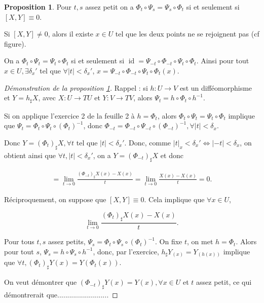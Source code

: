 \documentclass[french]{article}
\theoremstyle{definition}
\newtheorem{protoproposition}{Proposition}[section]
\newenvironment{prop}
    {\colorlet{shadecolor}{blue!5}\begin{shaded}\begin{protoproposition}}
    {\end{protoproposition}\end{shaded}}
\newcommand{\lesss}{<}
\newcommand{\less}{\lesss}
\begin{document}
\begin{prop}\label{crochet-zero}
  Pour \(t,s\) assez petit on a \(\Phi_t \circ \Psi_s = \Psi_s \circ \Phi_t\) si et seulement si \([X,Y] \equiv 0\).
\end{prop}


Si \([X,Y] \neq 0\), alors il existe \(x \in U\) tel que les deux points ne se rejoignent pas (cf figure).


On a \(\Phi_t \circ \Psi_t = \Psi_t \circ \Phi_t\) si et seulement si \(\operatorname{id} = \Psi _{-t} \circ \Phi _{-t} \circ \Psi_t \circ \Phi_t\). Ainsi pour tout \(x \in U, \exists \delta_x'\) tel que \(\forall \left\lvert t \right\rvert \less \delta_x'\),
\(x = \Psi _{-t} \circ \Phi _{-t} \circ \Psi_t \circ \Phi_t(x)\).

\begin{proof}[Démonstration de la proposition \ref{crochet-zero}]
  Rappel : si \(h : U \longrightarrow V\) est un difféomorphisme et \(Y = h _{\sharp}X\), avec \(X : U \longrightarrow T U\) et \(Y : V \longrightarrow T V\), alors \(\Psi_t = h \circ \Phi_t \circ h ^{-1}\).

  Si on applique l'exercice 2 de la feuille 2 à \(h = \Phi_t\), alors \(\Phi_t \circ \Psi_t = \Psi_t \circ \Phi_t\) implique que \(\Psi_t = \Phi_t \circ \Psi_t \circ (\Phi_t)^{-1}\), donc \(\Phi _{-t} = \Phi _{-t} \circ \Psi _{-t} \circ (\Phi _{-t})^{-1}, \forall \left\lvert t \right\rvert \less \delta_x\).

  Donc \(Y = (\Phi_t)_{\sharp}X, \forall t \) tel que \(\left\lvert t \right\rvert \less \delta_x'\). Donc, comme \(\left\lvert t \right\rvert_x \less \delta_x' \iff \left\lvert -t \right\rvert \less \delta_x\), on obtient ainsi que \(\forall t, \left\lvert t \right\rvert \less \delta_x'\), on a
  \(Y = (\Phi _{-t})_{\sharp}X\) et donc

  \begin{gather*}
    [X,Y] = \lim_{t \to 0} \frac{(\Phi _{-t})_{\sharp}X(x)-X(x)}{t} = \lim_{t \to 0} \frac{X(x)-X(x)}{t} =0.
  \end{gather*}

  Réciproquement, on suppose que \([X,Y] \equiv 0\). Cela implique que \(\forall x \in U\),

  \[\lim_{t \to 0} \frac{(\Phi_t)_{\sharp}X(x)-X(x)}{t}. \]

  Pour tous \(t,s\) assez petits, \(\Psi_s =\Phi_t \circ \Psi_s \circ (\Phi_t)^{-1}\). On fixe \(t\), on met \(h = \Phi_t\). Alors pour tout \(s\), \(\Psi_s = h \circ \Psi_s \circ h ^{-1}\), donc, par l'exercice, \(h _{\sharp}Y _{(x)} = Y _{(h(x))}\) implique que \(\forall t, (\Phi_t)_{\sharp}Y(x) = Y(\Phi_t(x))\).

  On veut démontrer que \((\Phi _{-t})_{\sharp}Y(x) = Y(x), \forall x \in U\) et \(t\) assez petit, ce qui démontrerait que..........................
\end{proof}

\end{document}
